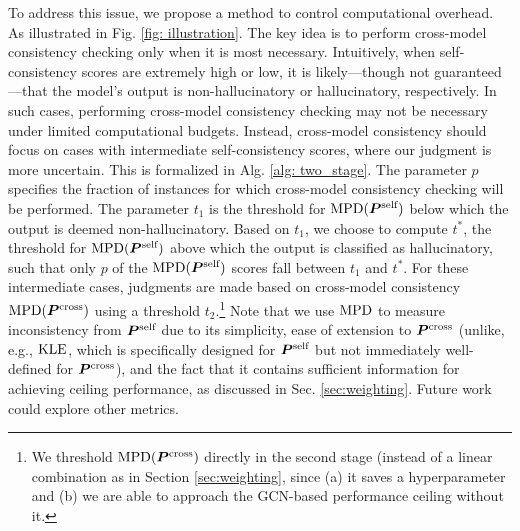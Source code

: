 To address this issue, we propose a method to control computational overhead. As illustrated in Fig. \ref{fig: illustration}. The key idea is to perform cross-model consistency checking only when it is most necessary. Intuitively, when self-consistency scores are extremely high or low, it is likely—though not guaranteed—that the model's output is non-hallucinatory or hallucinatory, respectively. In such cases, performing cross-model consistency checking may not be necessary under limited computational budgets. Instead, cross-model consistency should focus on cases with intermediate self-consistency scores, where our judgment is more uncertain. This is formalized in Alg. \ref{alg: two_stage}. The parameter \( p \) specifies the fraction of instances for which cross-model consistency checking will be performed. The parameter \( t_1 \) is the threshold for $\text{MPD}({\bm{P}}^{\text{self}})$ below which the output is deemed non-hallucinatory. Based on \( t_1 \), we choose to compute \( t^* \), the threshold for $\text{MPD}({\bm{P}}^{\text{self}})$ above which the output is classified as hallucinatory, such that only \( p \) of the $\text{MPD}({\bm{P}}^{\text{self}})$ scores fall between \( t_1 \) and \( t^* \). For these intermediate cases, judgments are made based on cross-model consistency $\text{MPD}({\bm{P}}^{\text{cross}})$ using a threshold \( t_2 \).\footnote{We threshold $\text{MPD}({\bm{P}}^{\text{cross}})$ directly in the second stage (instead of a linear combination as in Section \ref{sec:weighting}, since (a) it saves a hyperparameter and (b) we are able to approach the GCN-based performance ceiling without it.} Note that we use \( \text{MPD} \) to measure inconsistency from \( {\bm{P}}^{\text{self}} \) due to its simplicity, ease of extension to \( {\bm{P}}^{\text{cross}} \) (unlike, e.g., \( \text{KLE} \), which is specifically designed for \( {\bm{P}}^{\text{self}} \) but not immediately well-defined for \( {\bm{P}}^{\text{cross}} \)), and the fact that it contains sufficient information for achieving ceiling performance, as discussed in Sec. \ref{sec:weighting}. Future work could explore other metrics.




